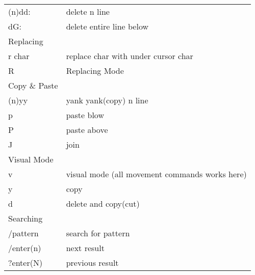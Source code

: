 \documentclass{book}
\begin{document}
\begin{longtable}{ll}
			(n)dd:                                      & delete n line                                     \\
			dG:                                         & delete entire line below                          \\ \hline
			Replacing                                   &                                                   \\ \hline
			r char                                      & replace char with under cursor char               \\
			R                                           & Replacing Mode                                    \\ \hline
			Copy \& Paste                               &                                                   \\ \hline
			(n)yy                                       & yank yank(copy) n line                            \\
			p                                           & paste blow                                        \\
			P                                           & paste above                                       \\
			J                                           & join                                              \\ \hline
			Visual Mode                                 &                                                   \\ \hline
			v                                           & visual mode (all movement commands works here)    \\
			y                                           & copy                                              \\
			d                                           & delete and copy(cut)                              \\ \hline
			Searching                                   &                                                   \\ \hline
			/pattern                                    & search for pattern                                \\
			/enter(n)                                   & next result                                       \\
			?enter(N)                                   & previous result                                   \\

\end{longtable}
\end{document}
